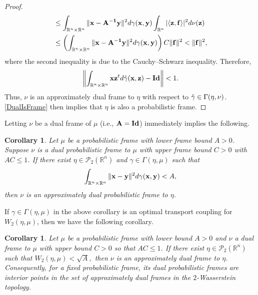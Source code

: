 \documentclass{amsart}
\numberwithin{equation}{section}
\newcommand{\norm}[1]{\left\Vert#1\right\Vert}
\theoremstyle{plain}
\newtheorem{corollary}[theorem]{Corollary}
\theoremstyle{remark}
\theoremstyle{definition}
\begin{document}
\begin{proof}
\begin{equation*}
\begin{split}
      & \leq  \int_{\mathbb{R}^n \times \mathbb{R}^n} \| {\bf x}-{\bf A^{-1} y} \|^2  d\gamma({\bf x, y}) \int_{\mathbb{R}^n}  | \langle {\bf z, f} \rangle |^2   d\nu({\bf z})   \\
      & \leq  \left(\int_{\mathbb{R}^n \times \mathbb{R}^n} \| {\bf x}-{\bf A^{-1} y} \|^2  d\gamma({\bf x, y})\right) C \|{\bf  f} \|^2  < \Vert  {\bf f} \Vert^2,
 \end{split}
    \end{equation*}
where the second inequality is due to the Cauchy–Schwarz inequality. Therefore,
\begin{equation*}
    \norm{\int_{\mathbb{R}^n \times \mathbb{R}^n} {\bf x} {\bf z}^t d\Tilde{\gamma}({\bf x, z}) - {\bf Id} } < 1.
\end{equation*}
Thus, $\nu $ is an approximately dual frame to $\eta$ with respect to $\Tilde{\gamma} \in \Gamma(\eta, \nu)$. \cref{DualIsFrame} then implies that $\eta$ is also a probabilistic frame. 
\end{proof}

Letting $\nu$ be a dual frame of $\mu$ (i.e., $\bf A = Id$) immediately implies the following.
\begin{corollary}\label{pertubedFrame}
Let $\mu$ be a probabilistic frame with lower frame bound $A>0$. Suppose $\nu$ is a dual probabilistic frame to $\mu$ with upper frame bound $C>0$ with $AC\leq 1$.  If there exist $\eta \in \mathcal{P}_2(\mathbb{R}^n)$  and $\gamma \in \Gamma(\eta, \mu) $ such that
    \begin{equation*}
        \int_{\mathbb{R}^n \times \mathbb{R}^n} \| {\bf x}- {\bf y} \|^2 d\gamma({\bf x},{\bf y})  < A,
    \end{equation*}
 then $\nu$ is an approximately dual probabilistic frame to $\eta$.
\end{corollary}

If $\gamma \in \Gamma(\eta, \mu)$ in the above corollary is an optimal transport coupling for $W_2(\eta, \mu)$, then we have the following corollary.
\begin{corollary}\label{corollary:DualFrameOpenness}
    Let $\mu$ be a probabilistic frame with lower bound $A>0$ and  $\nu$ a dual frame to $\mu$ with upper bound $C>0$ so that $AC\leq 1$.  If there exist $\eta \in \mathcal{P}_2(\mathbb{R}^n)$ such that $W_2(\eta, \mu)  < \sqrt{A},$
 then $\nu$ is an approximately dual frame to $\eta$. Consequently, for a fixed probabilistic frame, its dual probabilistic frames are interior points in the set of approximately dual frames in the $2$-Wasserstein topology.
\end{corollary}
\end{document}
